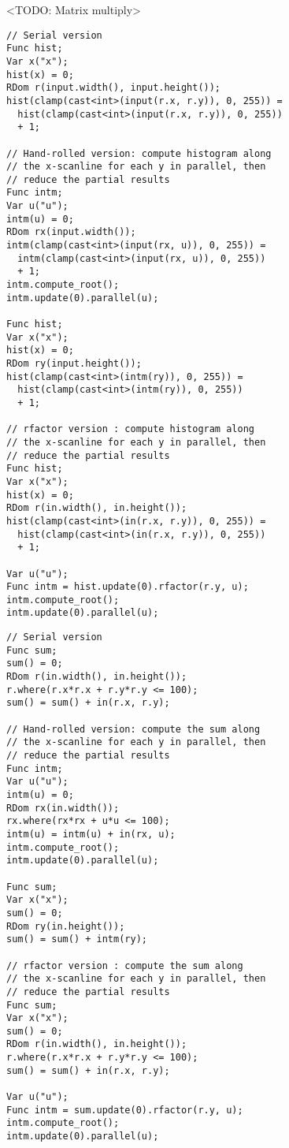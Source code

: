 <TODO: Matrix multiply> \\

\begin{lstlisting}[caption={Histogram: serial version, hand-rollled parallel associative reduction version, and rfactor parallel associative reduction version}]
// Serial version
Func hist;
Var x("x");
hist(x) = 0;
RDom r(input.width(), input.height());
hist(clamp(cast<int>(input(r.x, r.y)), 0, 255)) =
  hist(clamp(cast<int>(input(r.x, r.y)), 0, 255)) 
  + 1;

// Hand-rolled version: compute histogram along 
// the x-scanline for each y in parallel, then 
// reduce the partial results
Func intm;
Var u("u");
intm(u) = 0;
RDom rx(input.width());
intm(clamp(cast<int>(input(rx, u)), 0, 255)) = 
  intm(clamp(cast<int>(input(rx, u)), 0, 255)) 
  + 1;
intm.compute_root();
intm.update(0).parallel(u);

Func hist;
Var x("x");
hist(x) = 0;
RDom ry(input.height());
hist(clamp(cast<int>(intm(ry)), 0, 255)) =
  hist(clamp(cast<int>(intm(ry)), 0, 255)) 
  + 1;

// rfactor version : compute histogram along  
// the x-scanline for each y in parallel, then  
// reduce the partial results
Func hist;
Var x("x");
hist(x) = 0;
RDom r(in.width(), in.height());
hist(clamp(cast<int>(in(r.x, r.y)), 0, 255)) =
  hist(clamp(cast<int>(in(r.x, r.y)), 0, 255)) 
  + 1;

Var u("u");
Func intm = hist.update(0).rfactor(r.y, u);
intm.compute_root();
intm.update(0).parallel(u);
\end{lstlisting}

\begin{lstlisting}[caption={2D summation over a circular reduction domain with radius of 10: serial version, hand-rollled parallel associative reduction version, and rfactor parallel associative reduction version}]
// Serial version
Func sum;
sum() = 0;
RDom r(in.width(), in.height());
r.where(r.x*r.x + r.y*r.y <= 100);
sum() = sum() + in(r.x, r.y);

// Hand-rolled version: compute the sum along 
// the x-scanline for each y in parallel, then 
// reduce the partial results
Func intm;
Var u("u");
intm(u) = 0;
RDom rx(in.width());
rx.where(rx*rx + u*u <= 100);
intm(u) = intm(u) + in(rx, u);
intm.compute_root();
intm.update(0).parallel(u);

Func sum;
Var x("x");
sum() = 0;
RDom ry(in.height());
sum() = sum() + intm(ry);

// rfactor version : compute the sum along 
// the x-scanline for each y in parallel, then 
// reduce the partial results
Func sum;
Var x("x");
sum() = 0;
RDom r(in.width(), in.height());
r.where(r.x*r.x + r.y*r.y <= 100);
sum() = sum() + in(r.x, r.y);

Var u("u");
Func intm = sum.update(0).rfactor(r.y, u);
intm.compute_root();
intm.update(0).parallel(u);
\end{lstlisting}


